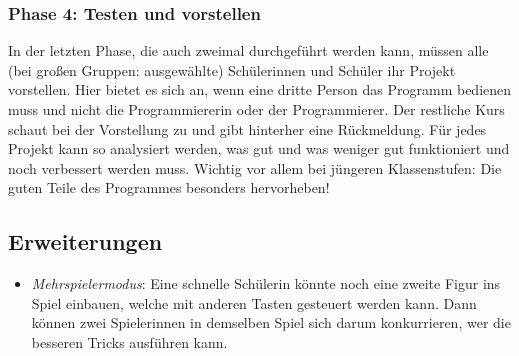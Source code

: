 \subsubsection{Phase 4: Testen und
vorstellen}\label{phase-4-testen-und-vorstellen}

In der letzten Phase, die auch zweimal durchgeführt werden kann, müssen
alle (bei großen Gruppen: ausgewählte) Schülerinnen und Schüler ihr
Projekt vorstellen. Hier bietet es sich an, wenn eine dritte Person das
Programm bedienen muss und nicht die Programmiererin oder der
Programmierer. Der restliche Kurs schaut bei der Vorstellung zu und gibt
hinterher eine Rückmeldung. Für jedes Projekt kann so analysiert werden,
was gut und was weniger gut funktioniert und noch verbessert werden
muss. Wichtig vor allem bei jüngeren Klassenstufen: Die guten Teile des
Programmes besonders hervorheben!

\subsection{Erweiterungen}\label{erweiterungen}

\begin{itemize}
\tightlist
\item
  \emph{Mehrspielermodus}: Eine schnelle Schülerin könnte noch eine
  zweite Figur ins Spiel einbauen, welche mit anderen Tasten gesteuert
  werden kann. Dann können zwei Spielerinnen in demselben Spiel sich
  darum konkurrieren, wer die besseren Tricks ausführen kann.
\end{itemize}

